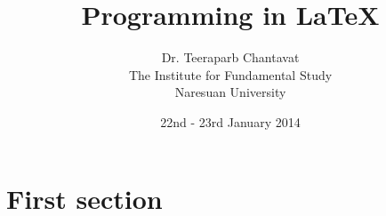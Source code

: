 \documentclass[10pt, a4paper]{article}
\title{Programming in \LaTeX}
\date{22nd - 23rd January 2014}
\author{Dr. Teeraparb Chantavat \\ The Institute for Fundamental Study \\Naresuan University}
\begin{document}
\maketitle				%
\section{First section}
\end{document}
